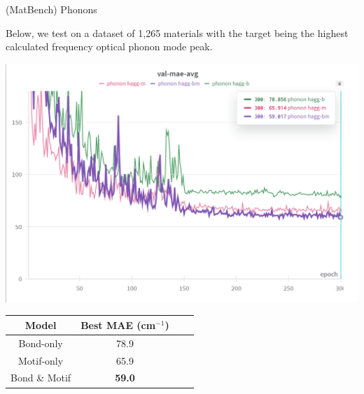 \documentclass[11pt]{beamer}
\begin{document}
\begin{frame}{(MatBench) Phonons}\small

Below, we test on a dataset of 1,265 materials with the target being the highest calculated frequency optical phonon mode peak.
\begin{center}

\includegraphics[scale=0.4]{phonons.png}

\medskip

\begin{tabular}{c|ccc}
Model & Best MAE (cm$^{-1}$) \\
\hline
Bond-only & 78.9\\
Motif-only & 65.9\\
Bond \& Motif & \textbf{59.0}\\
\end{tabular}
\end{center}
\end{frame}
\end{document}
